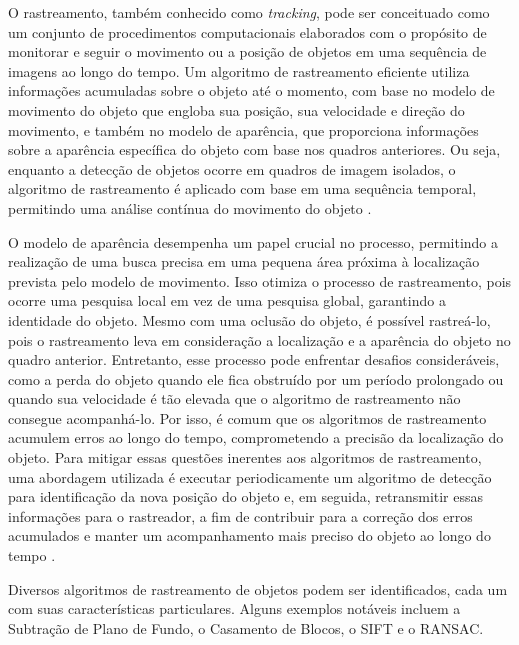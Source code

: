 O rastreamento, também conhecido como \textit{tracking}, pode ser conceituado como um conjunto de procedimentos computacionais elaborados com o propósito de monitorar e seguir o movimento ou a posição de objetos em uma sequência de imagens ao longo do tempo. Um algoritmo de rastreamento eficiente utiliza informações acumuladas sobre o objeto até o momento, com base no modelo de movimento do objeto que engloba sua posição, sua velocidade e direção do movimento, e também no modelo de aparência, que proporciona informações sobre a aparência específica do objeto com base nos quadros anteriores. Ou seja, enquanto a detecção de objetos ocorre em quadros de imagem isolados, o algoritmo de rastreamento é aplicado com base em uma sequência temporal, permitindo uma análise contínua do movimento do objeto \cite{tracking}.

O modelo de aparência desempenha um papel crucial no processo, permitindo a realização de uma busca precisa em uma pequena área próxima à localização prevista pelo modelo de movimento. Isso otimiza o processo de rastreamento, pois ocorre uma pesquisa local em vez de uma pesquisa global, garantindo a identidade do objeto. Mesmo com uma oclusão do objeto, é possível rastreá-lo, pois o rastreamento leva em consideração a localização e a aparência do objeto no quadro anterior. Entretanto, esse processo pode enfrentar desafios consideráveis, como a perda do objeto quando ele fica obstruído por um período prolongado ou quando sua velocidade é tão elevada que o algoritmo de rastreamento não consegue acompanhá-lo. Por isso, é comum que os algoritmos de rastreamento acumulem erros ao longo do tempo, comprometendo a precisão da localização do objeto. Para mitigar essas questões inerentes aos algoritmos de rastreamento, uma abordagem utilizada é executar periodicamente um algoritmo de detecção para identificação da nova posição do objeto e, em seguida, retransmitir essas informações para o rastreador, a fim de contribuir para a correção dos erros acumulados e manter um acompanhamento mais preciso do objeto ao longo do tempo \cite{tracking}.


Diversos algoritmos de rastreamento de objetos podem ser identificados, cada um com suas características particulares. Alguns exemplos notáveis incluem a Subtração de Plano de Fundo, o Casamento de Blocos, o \ac{SIFT} e o \ac{RANSAC}.

